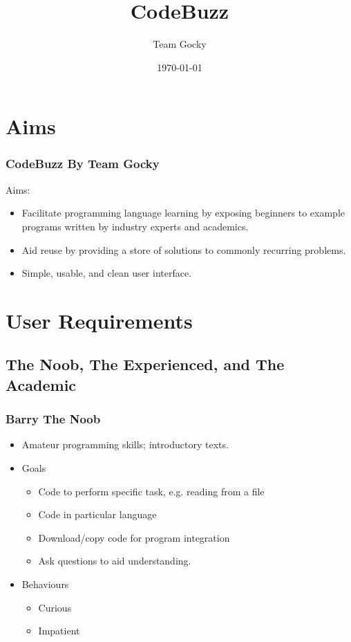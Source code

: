 \documentclass[handout, t]{beamer}
\title[DIM3 Project Presentation]{CodeBuzz}
\author{Team Gocky}
\institute{University Of Glasgow}
\date{\today}
\begin{document}
\section{Aims}

\begin{frame}
\frametitle{CodeBuzz By Team Gocky}
Aims:
\begin{itemize}
\item Facilitate programming language learning by exposing beginners to
example programs written by industry experts and academics.
\item Aid reuse by providing a store of solutions to commonly recurring
problems.
\item Simple, usable, and clean user interface.
\end{itemize}
\end{frame}

\section{User Requirements}

\subsection{The Noob, The Experienced, and The Academic}

\begin{frame}
\frametitle{Barry The Noob}
\begin{itemize}
\item Amateur programming skills; introductory texts.
\item Goals
    \begin{itemize}
    \item Code to perform specific task, e.g. reading from a file
    \item Code in particular language
    \item Download/copy code for program integration
    \item Ask questions to aid understanding.
    \end{itemize}
\item Behaviours
    \begin{itemize}
    \item Curious
    \item Impatient
    \end{itemize}
\end{itemize}
\end{frame}
\end{document}
